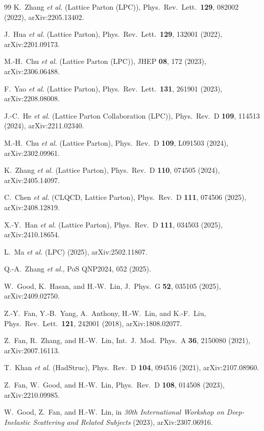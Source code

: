 \documentclass[12pt,a4paper]{ctexart}
\begin{document}
\begin{thebibliography}{99}
 K.~Zhang \textit{et al.} (Lattice Parton (LPC)), Phys.\ Rev.\ Lett.\ \textbf{129}, 082002 (2022), arXiv:2205.13402.

 J.~Hua \textit{et al.} (Lattice Parton), Phys.\ Rev.\ Lett.\ \textbf{129}, 132001 (2022), arXiv:2201.09173.

 M.-H.~Chu \textit{et al.} (Lattice Parton (LPC)), JHEP \textbf{08}, 172 (2023), arXiv:2306.06488.

 F.~Yao \textit{et al.} (Lattice Parton), Phys.\ Rev.\ Lett.\ \textbf{131}, 261901 (2023), arXiv:2208.08008.

 J.-C.~He \textit{et al.} (Lattice Parton Collaboration (LPC)), Phys.\ Rev.\ D \textbf{109}, 114513 (2024), arXiv:2211.02340.

 M.-H.~Chu \textit{et al.} (Lattice Parton), Phys.\ Rev.\ D \textbf{109}, L091503 (2024), arXiv:2302.09961.

 K.~Zhang \textit{et al.} (Lattice Parton), Phys.\ Rev.\ D \textbf{110}, 074505 (2024), arXiv:2405.14097.

 C.~Chen \textit{et al.} (CLQCD, Lattice Parton), Phys.\ Rev.\ D \textbf{111}, 074506 (2025), arXiv:2408.12819.

 X.-Y.~Han \textit{et al.} (Lattice Parton), Phys.\ Rev.\ D \textbf{111}, 034503 (2025), arXiv:2410.18654.

 L.~Ma \textit{et al.} (LPC) (2025), arXiv:2502.11807.

 Q.-A.~Zhang \textit{et al.}, PoS QNP2024, 052 (2025).

 W.~Good, K.~Hasan, and H.-W.~Lin, J.\ Phys.\ G \textbf{52}, 035105 (2025), arXiv:2409.02750.

 Z.-Y.~Fan, Y.-B.~Yang, A.~Anthony, H.-W.~Lin, and K.-F.~Liu, Phys.\ Rev.\ Lett.\ \textbf{121}, 242001 (2018), arXiv:1808.02077.

 Z.~Fan, R.~Zhang, and H.-W.~Lin, Int.\ J.\ Mod.\ Phys.\ A \textbf{36}, 2150080 (2021), arXiv:2007.16113.

 T.~Khan \textit{et al.} (HadStruc), Phys.\ Rev.\ D \textbf{104}, 094516 (2021), arXiv:2107.08960.

 Z.~Fan, W.~Good, and H.-W.~Lin, Phys.\ Rev.\ D \textbf{108}, 014508 (2023), arXiv:2210.09985.

 W.~Good, Z.~Fan, and H.-W.~Lin, in \textit{30th International Workshop on Deep-Inelastic Scattering and Related Subjects} (2023), arXiv:2307.06916.


\end{thebibliography}
\end{document}

